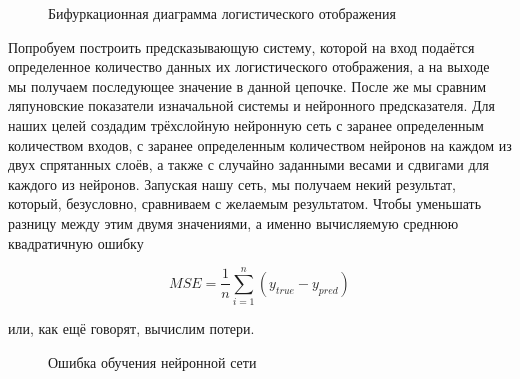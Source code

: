 \documentclass[a4paper]{article}
\begin{document}
\begin{figure}[h]
\caption{Бифуркационная диаграмма логистического отображения}
\label{fig:image}
\end{figure}

\newpage

Попробуем построить предсказывающую систему, которой на вход подаётся определенное количество данных их логистического отображения, а на выходе мы получаем последующее значение в данной цепочке. После же мы сравним ляпуновские показатели изначальной системы и нейронного предсказателя. Для наших целей создадим трёхслойную нейронную сеть с заранее определенным количеством входов, с заранее определенным количеством нейронов на каждом из двух спрятанных слоёв, а также с случайно заданными весами и сдвигами для каждого из нейронов. Запуская нашу сеть, мы получаем некий результат, который, безусловно, сравниваем с желаемым результатом. Чтобы уменьшать разницу между этим двумя значениями, а именно вычисляемую среднюю квадратичную ошибку

\begin{equation*}
MSE = \dfrac{1}{n}\sum_{i=1}^{n}{(y_{true} - y_{pred})}
\end{equation*}

или, как ещё говорят, вычислим потери. 

\begin{figure}[h]
\caption{Ошибка обучения нейронной сети}
\label{fig:image}
\end{figure}
\end{document}
